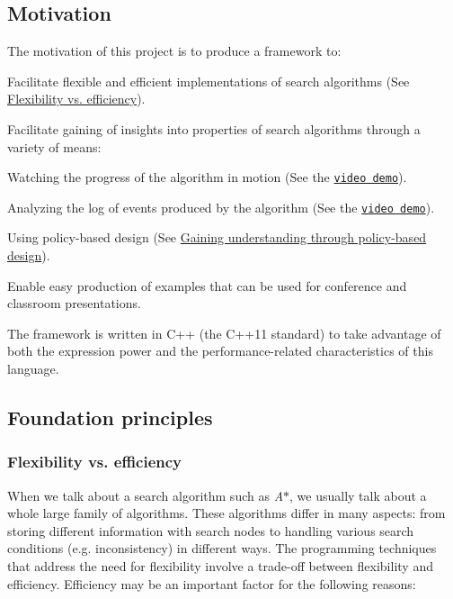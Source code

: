 \hypertarget{index_s-motivation}{}\subsection{Motivation}\label{index_s-motivation}
The motivation of this project is to produce a framework to\+:


\begin{DoxyItemize}
\item Facilitate flexible and efficient implementations of search algorithms (See \hyperlink{index_s-flexibility-efficiency}{Flexibility vs. efficiency}).
\item Facilitate gaining of insights into properties of search algorithms through a variety of means\+:
\begin{DoxyItemize}
\item Watching the progress of the algorithm in motion (See the \href{https://youtu.be/cElxLWve1Zw}{\tt video demo}).
\item Analyzing the log of events produced by the algorithm (See the \href{https://youtu.be/cElxLWve1Zw}{\tt video demo}).
\item Using policy-\/based design (See \hyperlink{index_s-policy}{Gaining understanding through policy-\/based design}).
\end{DoxyItemize}
\item Enable easy production of examples that can be used for conference and classroom presentations.
\end{DoxyItemize}

The framework is written in {\ttfamily C++} (the {\ttfamily C++11} standard) to take advantage of both the expression power and the performance-\/related characteristics of this language.\hypertarget{index_s-principles}{}\subsection{Foundation principles}\label{index_s-principles}
\hypertarget{index_s-flexibility-efficiency}{}\subsubsection{Flexibility vs. efficiency}\label{index_s-flexibility-efficiency}
When we talk about a search algorithm such as {\itshape A$\ast$}, we usually talk about a whole large family of algorithms. These algorithms differ in many aspects\+: from storing different information with search nodes to handling various search conditions (e.\+g. inconsistency) in different ways. The programming techniques that address the need for flexibility involve a trade-\/off between flexibility and efficiency. Efficiency may be an important factor for the following reasons\+:


